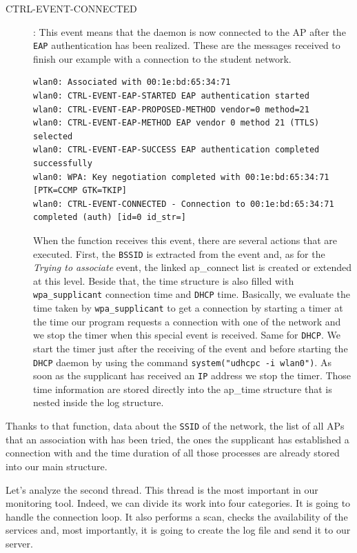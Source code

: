 \begin{description}
	\item[CTRL-EVENT-CONNECTED]:
	This event means that the daemon is now connected to the AP after the \texttt{EAP} authentication has been realized. These are the messages received to finish our example with a connection to the student network.\\

\begin{lstlisting}[frame=single,breaklines=true,caption={Example of a connection to the \texttt{student.UCLouvain} network - 3}]
wlan0: Associated with 00:1e:bd:65:34:71
wlan0: CTRL-EVENT-EAP-STARTED EAP authentication started
wlan0: CTRL-EVENT-EAP-PROPOSED-METHOD vendor=0 method=21
wlan0: CTRL-EVENT-EAP-METHOD EAP vendor 0 method 21 (TTLS) selected
wlan0: CTRL-EVENT-EAP-SUCCESS EAP authentication completed successfully
wlan0: WPA: Key negotiation completed with 00:1e:bd:65:34:71 [PTK=CCMP GTK=TKIP]
wlan0: CTRL-EVENT-CONNECTED - Connection to 00:1e:bd:65:34:71 completed (auth) [id=0 id_str=]
\end{lstlisting}

	When the function receives this event, there are several actions that are executed. First, the \texttt{BSSID} is extracted from the event and, as for the \textit{Trying to associate} event, the linked ap\_connect list is created or extended at this level. Beside that, the time structure is also filled with \texttt{wpa\_supplicant} connection time and \texttt{DHCP} time. Basically, we evaluate the time taken by \texttt{wpa\_supplicant} to get a connection by starting a timer at the time our program requests a connection with one of the network and we stop the timer when this special event is received. Same for \texttt{DHCP}. We start the timer just after the receiving of the event and before starting the \texttt{DHCP} daemon by using the command \texttt{system("udhcpc -i wlan0")}. As soon as the supplicant has received an \texttt{IP} address we stop the timer. Those time information are stored directly into the ap\_time structure that is nested inside the log structure.
\end{description}

Thanks to that function, data about the \texttt{SSID} of the network, the list of all APs that an association with has been tried, the ones the supplicant has established a connection with and the time duration of all those processes are already stored into our main structure.


Let's analyze the second thread. This thread is the most important in our monitoring tool. Indeed, we can divide its work into four categories. It is going to handle the connection loop. It also performs a scan, checks the availability of the services and, most importantly, it is going to create the log file and send it to our server. 

